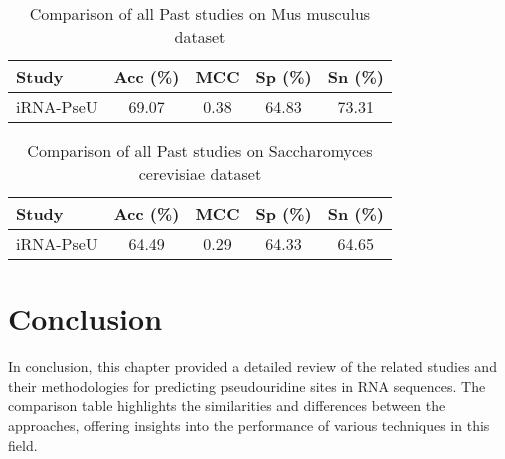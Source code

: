     \begin{table}[h!]
      \centering
      \begin{tabular}{lcccc}
        \toprule
        \textbf{Study} & \textbf{Acc} (\%) & \textbf{MCC} & \textbf{Sp} (\%) & \textbf{Sn} (\%) \\
        \midrule
        iRNA-PseU      & 69.07             & 0.38         & 64.83            & 73.31            \\
        \bottomrule
      \end{tabular}
      \caption{Comparison of all Past studies on Mus musculus dataset}
      \label{tab:mouse_comp_table}
    \end{table}

    \begin{table}[h!]
      \centering
      \begin{tabular}{lcccc}
        \toprule
        \textbf{Study} & \textbf{Acc} (\%) & \textbf{MCC} & \textbf{Sp} (\%) & \textbf{Sn} (\%) \\
        \midrule
        iRNA-PseU      & 64.49             & 0.29         & 64.33            & 64.65            \\
        \bottomrule
      \end{tabular}
      \caption{Comparison of all Past studies on Saccharomyces cerevisiae dataset}
      \label{tab:yeast_comp_table}
    \end{table}


  \section{Conclusion}
    In conclusion, this chapter provided a detailed review of the related studies and their methodologies for predicting pseudouridine sites in RNA sequences. The comparison table highlights the similarities and differences between the approaches, offering insights into the performance of various techniques in this field.